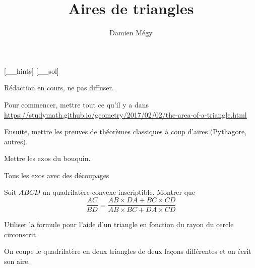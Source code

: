 




[_\jobname_hints]
[_\jobname_sol]


\title{Aires de triangles}
\author{Damien Mégy}
\maketitle

Rédaction en cours, ne pas diffuser.

Pour commencer, mettre tout ce qu'il y a dans \url{https://studymath.github.io/geometry/2017/02/02/the-area-of-a-triangle.html}

Ensuite, mettre les preuves de théorèmes classiques à coup d'aires (Pythagore, autres).

Mettre les exos du bouquin.

Tous les exos avec des découpages

\begin{exo}
Soit $ABCD$ un quadrilatère convexe inscriptible.
Montrer que
\[ \frac{AC}{BD} = \frac{AB\times DA + BC\times CD}{AB\times BC + DA\times CD}\]
\begin{hint}
Utiliser la formule pour l'aide d'un triangle en fonction du rayon du cercle circonscrit.
\end{hint}
\begin{sol}
On coupe le quadrilatère en deux triangles de deux façons différentes et on écrit son aire.
\end{sol}
\end{exo}


\indications
\correction




